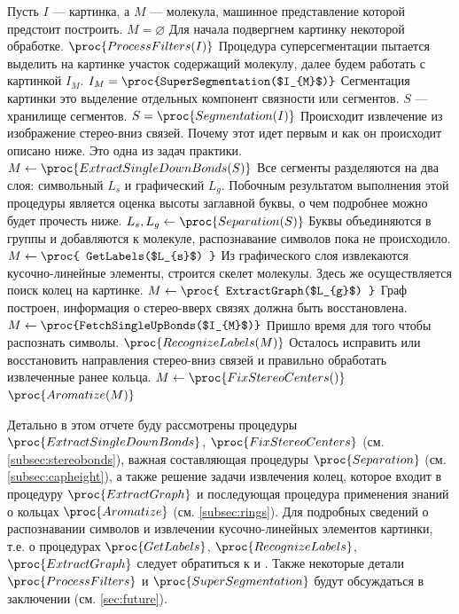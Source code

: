 \begin{codebox}
  \li \Comment Пусть $I$ --- картинка, а $M$ --- молекула, 
  \li машинное представление которой предстоит построить.
  \li $M = \varnothing $
  \li
  \li \Comment Для начала подвергнем картинку некоторой обработке.
  \li $\proc{ProcessFilters(I)}$
  \li
  \li \Comment Процедура суперсегментации пытается выделить на картинке 
  \li \Comment участок содержащий молекулу,
  \li \Comment далее будем работать с картинкой $I_{M}$.
  \li $ I_{M} = \proc{SuperSegmentation($I_{M}$)} $
  \li  
  \li \Comment Сегментация картинки это выделение отдельных компонент связности или сегментов. 
  \li \Comment $S$ --- хранилище сегментов.
  \li $ S = \proc{Segmentation(I)} $
  \li 
  \li \Comment Происходит извлечение из изображение стерео-вниз связей. Почему этот идет первым и
  \li \Comment как он происходит описано ниже. Это одна из задач практики.
  \li $ M \gets \proc{ExtractSingleDownBonds(S)} $
  \li
  \li \Comment Все сегменты разделяются на два слоя: символьный $L_{s}$ и графический $L_{g}$. 
  \li \Comment Побочным результатом выполнения этой процедуры является оценка высоты заглавной
  \li \Comment буквы, о чем подробнее можно будет прочесть ниже.
  \li $ L_{s}, L_{g} \gets \proc{Separation(S)} $
  \li 
  \li \Comment Буквы объединяются в группы и добавляются к молекуле, распознавание символов пока
  \li \Comment не происходило.
  \li $ M \gets \proc{ GetLabels($L_{s}$) } $
  \li
  \li \Comment Из графического слоя извлекаются кусочно-линейные элементы, строится скелет молекулы.
  \li \Comment Здесь же осуществляется поиск колец на картинке.
  \li $ M \gets \proc{ ExtractGraph($L_{g}$) } $
  \li
  \li \Comment Граф построен, информация о стерео-вверх связях должна быть восстановлена.
  \li $ M \gets \proc{FetchSingleUpBonds($I_{M}$)} $
  \li
  \li \Comment Пришло время для того чтобы распознать символы.
  \li $ \proc{RecognizeLabels(M)} $
  \li
  \li \Comment Осталось исправить или восстановить направления стерео-вниз связей и
  \li \Comment правильно обработать извлеченные ранее кольца.
  \li $ M \gets \proc{FixStereoCenters()} $
  \li $ \proc{Aromatize(M)} $
\end{codebox}

\noindent
Детально в этом отчете буду рассмотрены процедуры $\proc{ExtractSingleDownBonds}$, $\proc{FixStereoCenters}$ (см. \ref{subsec:stereobonds}), важная
составляющая процедуры $\proc{Separation}$ (см. \ref{subsec:capheight}), а также решение задачи извлечения колец, которое 
входит в процедуру $\proc{ExtractGraph}$ и последующая процедура применения знаний о кольцах $\proc{Aromatize}$ (см. \ref{subsec:rings}). Для 
подробных сведений о распознавании символов и извлечении кусочно-линейных элементов картинки, т.е. о процедурах $\proc{GetLabels}$, 
$\proc{RecognizeLabels}$, $\proc{ExtractGraph}$ следует обратиться к \cite{smolov} и \cite{zahn}. Также некоторые детали
$\proc{ProcessFilters}$ и $\proc{SuperSegmentation}$ будут обсуждаться в заключении (см. \ref{sec:future}). 


